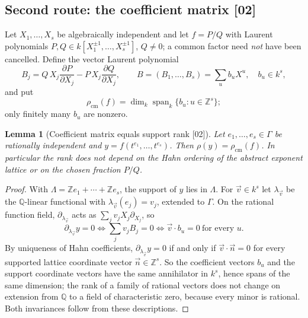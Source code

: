 \documentclass[11pt,letterpaper]{article}
\numberwithin{equation}{section}
\newtheorem{lemma}[lemma]{Lemma}
\theoremstyle{definition}
\theoremstyle{remark}
\newcommand{\Q}{\mathbb Q}
\newcommand{\Z}{\mathbb Z}
\newcommand{\src}[1]{\textup{[#1]}}%
\begin{document}
\subsection{Second route: the coefficient matrix \src{02}}

Let $X_1,\ldots,X_s$ be algebraically independent and let $f=P/Q$ with
Laurent polynomials $P,Q\in k[X_1^{\pm1},\ldots,X_s^{\pm1}]$, $Q\ne0$; a
common factor need \emph{not} have been cancelled. Define the vector Laurent
polynomial
\begin{equation}\label{adr:sr:eq:Bvector}
 B_j=Q\,X_j\frac{\partial P}{\partial X_j}-P\,X_j\frac{\partial Q}{\partial X_j},
 \qquad B=(B_1,\ldots,B_s)=\sum_ub_uX^u,\quad b_u\in k^s,
\end{equation}
and put
\begin{equation}\label{adr:sr:eq:rhocm}
 \rho_{\mathrm{cm}}(f)=\dim_k\operatorname{span}_k\{b_u:u\in\Z^s\};
\end{equation}
only finitely many $b_u$ are nonzero.

\begin{lemma}[Coefficient matrix equals support rank \src{02}]
\label{adr:sr:lem:rhocm}
Let $e_1,\ldots,e_s\in\Gamma$ be rationally independent and
$y=f(t^{e_1},\ldots,t^{e_s})$. Then $\rho(y)=\rho_{\mathrm{cm}}(f)$. In
particular the rank does not depend on the Hahn ordering of the abstract
exponent lattice or on the chosen fraction $P/Q$.
\end{lemma}
\begin{proof}
With $\Lambda=\Z e_1+\cdots+\Z e_s$, the support of $y$ lies in $\Lambda$. For
$\vec v\in k^s$ let $\lambda_{\vec v}$ be the $\Q$-linear functional with
$\lambda_{\vec v}(e_j)=v_j$, extended to $\Gamma$. On the rational function
field, $\partial_{\lambda_{\vec v}}$ acts as $\sum_jv_jX_j\partial_{X_j}$, so
\[
 \partial_{\lambda_{\vec v}}y=0
 \iff\sum_jv_jB_j=0
 \iff\vec v\cdot b_u=0\ \text{for every }u.
\]
By uniqueness of Hahn coefficients,
$\partial_{\lambda_{\vec v}}y=0$ if and only if $\vec v\cdot\vec n=0$ for every
supported lattice coordinate vector $\vec n\in\Z^s$. So the coefficient vectors
$b_u$ and the support coordinate vectors have the same annihilator in $k^s$,
hence spans of the same dimension; the rank of a family of rational vectors
does not change on extension from $\Q$ to a field of characteristic zero,
because every minor is rational. Both invariances follow from these
descriptions.
\end{proof}
\end{document}
